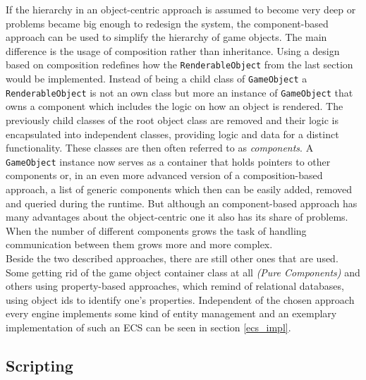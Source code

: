 If the hierarchy in an object-centric approach is assumed to become very deep or problems became big enough to redesign the system, the component-based approach can be used to simplify the hierarchy of game objects. The main difference is the usage of composition rather than inheritance. Using a design based on composition redefines how the \texttt{RenderableObject} from the last section would be implemented. Instead of being a child class of \texttt{GameObject} a \texttt{RenderableObject} is not an own class but more an instance of \texttt{GameObject} that owns a component which includes the logic on how an object is rendered. The previously child classes of the root object class are removed and their logic is encapsulated into independent classes, providing logic and data for a distinct functionality. These classes are then often referred to as \textit{components}. A \texttt{GameObject} instance now serves as a container that holds pointers to other components or, in an even more advanced version of a composition-based approach, a list of generic components which then can be easily added, removed and queried during the runtime. But although an component-based approach has many advantages about the object-centric one it also has its share of problems. When the number of different components grows the task of handling communication between them grows more and more complex.\\

\noindent
Beside the two described approaches, there are still other ones that are used. Some getting rid of the game object container class at all \textit{(Pure Components)} and others using property-based approaches, which remind of relational databases, using object ids to identify one's properties. Independent of the chosen approach every engine implements some kind of entity management and an exemplary implementation of such an \acl{ECS} can be seen in section \ref{ecs_impl}.

\subsection{Scripting}


